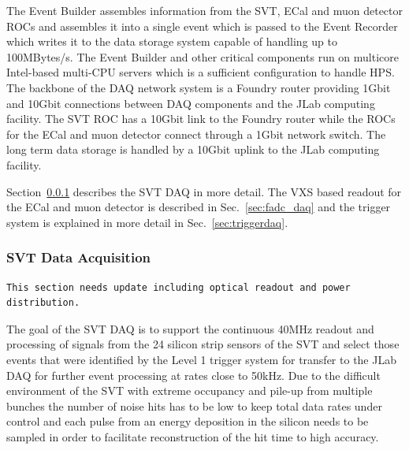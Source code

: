 The Event Builder assembles 
information from the SVT, ECal and muon detector ROCs and assembles it into a single 
event which is passed to the Event Recorder which writes it to the data storage system capable of handling up to 100MBytes/s. The Event Builder and other 
critical components run on multicore Intel-based multi-CPU servers which is a 
sufficient configuration to handle HPS. The backbone of the DAQ network system is a 
Foundry router providing 1Gbit and 10Gbit connections between DAQ components and 
the JLab computing facility. The SVT ROC has a 10Gbit link to the Foundry router while the 
ROCs for the ECal and muon detector connect through a 1Gbit network switch. The long 
term data storage is handled by a 10Gbit uplink to the JLab computing facility. 

Section~\ref{sec:svt_daq} describes the SVT DAQ in more detail. The VXS based readout for 
the ECal and muon detector is described in Sec.~\ref{sec:fadc_daq} and the trigger 
system is explained in more detail in Sec.~\ref{sec:triggerdaq}.

\subsubsection{SVT Data Acquisition}
\label{sec:svt_daq}

\begin{verbatim}
This section needs update including optical readout and power distribution.
\end{verbatim}


The goal of the SVT DAQ is to support the continuous 40MHz readout and processing of signals from 
the 24 silicon strip sensors of the SVT and select those events that were identified by the 
Level 1 trigger system for transfer to the JLab DAQ for further event processing at rates 
close to 50kHz. 
Due to the difficult environment of the SVT with extreme occupancy and pile-up from multiple bunches  the number of noise hits has to be low to keep total data rates under control and 
each pulse from an energy deposition in the silicon needs to be sampled in order to facilitate 
reconstruction of the hit time to high accuracy. 

